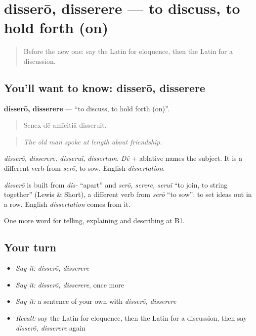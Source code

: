 \section[disserō, disserere]{disserō, disserere — to discuss, to hold forth (on)}

\label{lesson:LA-C368-dissero}



\begin{quote}
Before the new one: say the Latin for eloquence, then the Latin for a discussion.
\end{quote}

\subsection*{You'll want to know: disserō, disserere}
\textbf{disserō, disserere} — \textquotedblleft{}to discuss, to hold forth (on)\textquotedblright{}.

\begin{quote}
Senex dē amīcitiā disseruit.
\end{quote}

\begin{quote}
\emph{The old man spoke at length about friendship.}
\end{quote}

\emph{disserō, disserere, disseruī, dissertum}. \emph{Dē} + ablative names the subject. It is a different verb from \emph{serō}, to sow. English \emph{dissertation}.

\begin{cousinweb}
\emph{disserō} is built from \emph{dis-} \textquotedblleft{}apart\textquotedblright{} and \emph{serō, serere, seruī} \textquotedblleft{}to join, to string together\textquotedblright{} (Lewis \& Short), a different verb from \emph{serō} \textquotedblleft{}to sow\textquotedblright{}: to set ideas out in a row. English \emph{dissertation} comes from it.
\end{cousinweb}

\begin{grammarlens}[title={What you've built}]
One more word for telling, explaining and describing at B1.
\end{grammarlens}

\subsection*{Your turn}
\begin{itemize}
\raggedright
  \item \emph{Say it:} \emph{disserō, disserere}
  \item \emph{Say it:} \emph{disserō, disserere}, once more
  \item \emph{Say it:} a sentence of your own with \emph{disserō, disserere}
  \item \emph{Recall:} say the Latin for eloquence, then the Latin for a discussion, then say \emph{disserō, disserere} again
\end{itemize}

